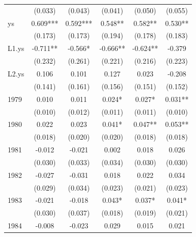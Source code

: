 \begin{table}[hptb]
\begin{tabular}{lccccc}
        & (0.033)         & (0.043)         & (0.041)         & (0.050)         & (0.055)              \\
  ys    & 0.609{***}      & 0.592{***}      & 0.548{**}       & 0.582{**}       & 0.530{**}            \\
        & (0.173)         & (0.173)         & (0.194)         & (0.178)         & (0.183)              \\
  L1.ys & -0.711{**}      & -0.566{*}       & -0.666{**}      & -0.624{**}      & -0.379               \\
        & (0.232)         & (0.261)         & (0.221)         & (0.216)         & (0.223)              \\
  L2.ys & 0.106           & 0.101           & 0.127           & 0.023           & -0.208               \\
        & (0.141)         & (0.161)         & (0.156)         & (0.151)         & (0.152)              \\
  1979  & 0.010           & 0.011           & 0.024{*}        & 0.027{*}        & 0.031{**}            \\
        & (0.010)         & (0.012)         & (0.011)         & (0.011)         & (0.010)              \\
  1980  & 0.022           & 0.023           & 0.041{*}        & 0.047{**}       & 0.053{**}            \\
        & (0.018)         & (0.020)         & (0.020)         & (0.018)         & (0.018)              \\
  1981  & -0.012          & -0.021          & 0.002           & 0.018           & 0.026                \\
        & (0.030)         & (0.033)         & (0.034)         & (0.030)         & (0.030)              \\
  1982  & -0.027          & -0.031          & 0.018           & 0.022           & 0.034                \\
        & (0.029)         & (0.034)         & (0.023)         & (0.021)         & (0.023)              \\
  1983  & -0.021          & -0.018          & 0.043{*}        & 0.037{*}        & 0.041{*}             \\
        & (0.030)         & (0.037)         & (0.018)         & (0.019)         & (0.021)              \\
  1984  & -0.008          & -0.023          & 0.029           & 0.015           & 0.021                \\

\end{tabular}
\end{table}
